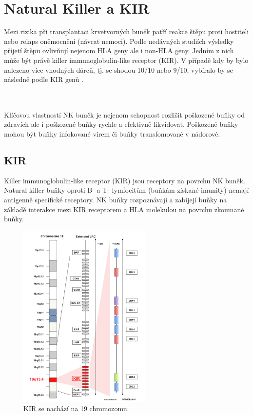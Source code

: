 \documentclass[czech,DP]{thesiskiv}
\begin{document}
\section{Natural Killer a KIR}
Mezi rizika při transplantaci krvetvorných buněk patří reakce štěpu proti hostiteli nebo relaps oněmocnění (návrat nemoci). Podle nedávných studiích výsledky příjetí štěpu ovlivňují nejenom HLA geny ale i non-HLA geny. Jedním z nich může být právě killer immunoglobulin-like receptor (KIR). V případě kdy by bylo nalezeno více vhodných dárců, tj. se shodou 10/10 nebo 9/10, vybíralo by se následně podle KIR genů \cite{KIR_transplantace_jindra} \cite{Frycova_bakalarka}.


\\
\\
Klíčovou vlastností NK buněk je nejenom schopnost rozlišit poškozené buňky od zdravích ale i poškozené buňky rychle a efektivně likvidovat. Poškozené buňky mohou být buňky infokované virem či buňky transfomované v nádorové. 

\subsection{KIR}
Killer immunoglobulin-like receptor (KIR) jsou receptory na povrchu NK buněk. Natural killer buňky oproti B- a T- lymfocitům (buňkám získané imunity) nemají antigenně specifické receptory. NK buňky rozpoznávají a zabíjejí buňky na základě interakce mezi KIR receptorem a HLA molekulou na povrchu zkoumané buňky. 
\begin{figure}[H]		
		\centering
		\includegraphics[width=250px]{./img/kir_pozice.png}
		\caption{KIR se nachází na 19 chromozomu. \cite{imgt_hla_database}}
		\label{fig:kir_position}
\end{figure}
\end{document}
